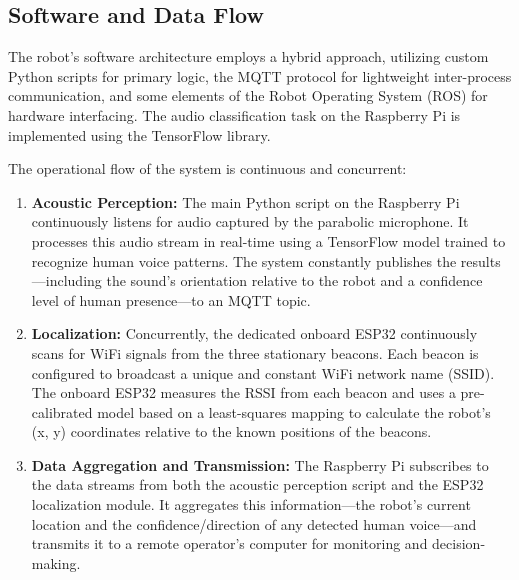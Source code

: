 \subsection{Software and Data Flow}
The robot's software architecture employs a hybrid approach, utilizing custom Python scripts for primary logic, the MQTT protocol for lightweight inter-process communication, and some elements of the Robot Operating System (ROS) for hardware interfacing. The audio classification task on the Raspberry Pi is implemented using the TensorFlow library.

The operational flow of the system is continuous and concurrent:
\begin{enumerate}
    \item \textbf{Acoustic Perception:} The main Python script on the Raspberry Pi continuously listens for audio captured by the parabolic microphone. It processes this audio stream in real-time using a TensorFlow model trained to recognize human voice patterns. The system constantly publishes the results—including the sound's orientation relative to the robot and a confidence level of human presence—to an MQTT topic.
    \item \textbf{Localization:} Concurrently, the dedicated onboard ESP32 continuously scans for WiFi signals from the three stationary beacons. Each beacon is configured to broadcast a unique and constant WiFi network name (SSID). The onboard ESP32 measures the RSSI from each beacon and uses a pre-calibrated model based on a least-squares mapping to calculate the robot's (x, y) coordinates relative to the known positions of the beacons.
    \item \textbf{Data Aggregation and Transmission:} The Raspberry Pi subscribes to the data streams from both the acoustic perception script and the ESP32 localization module. It aggregates this information—the robot's current location and the confidence/direction of any detected human voice—and transmits it to a remote operator's computer for monitoring and decision-making.
\end{enumerate}

